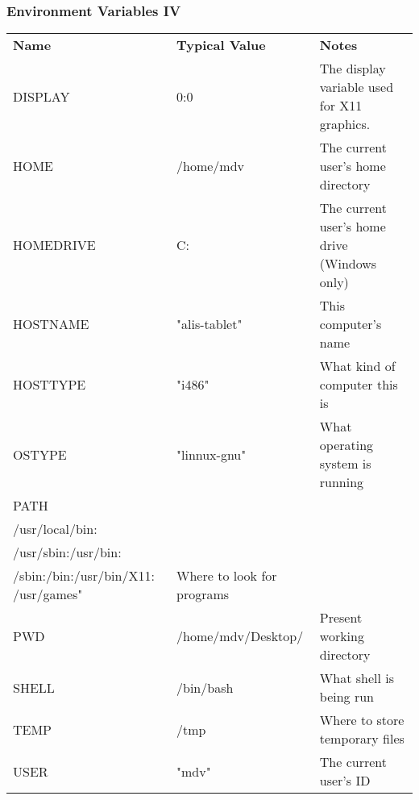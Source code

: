 \begin{frame}\frametitle{Environment Variables IV}
\footnotesize{
\begin{tabular}{|l|l|l}
\textbf{Name} & \textbf{Typical Value} & \textbf{Notes}\\
DISPLAY & 0:0 & \begin{minipage}{4cm}The display variable used for X11 graphics.\end{minipage}\\
HOME & /home/mdv &	The current user's home directory\\
HOMEDRIVE & C:	& \begin{minipage}{4cm}The current user's home drive (Windows only)\end{minipage}\\
HOSTNAME &	"alis-tablet"	 & This computer's name\\
HOSTTYPE &	"i486"	& What kind of computer this is\\
OSTYPE &	"linnux-gnu"	& What operating system is running\\
PATH	& \begin{minipage}{3cm}"/usr/local/sbin: \\/usr/local/bin: \\/usr/sbin:/usr/bin: \\/sbin:/bin:/usr/bin/X11: /usr/games"\end{minipage} & Where to look for programs\\
PWD	& /home/mdv/Desktop/ &	Present working directory \\
SHELL	& /bin/bash	& What shell is being run\\
TEMP	& /tmp &	Where to store temporary files\\
USER	& "mdv"	& The current user's ID
\end{tabular}}
\end{frame}

